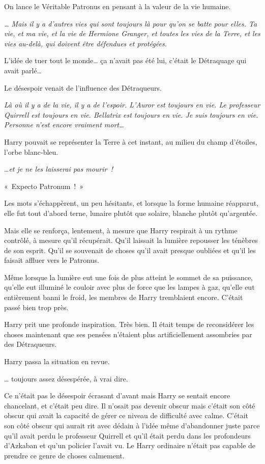 On lance le Véritable Patronus en pensant à la valeur de la vie humaine.

\emph{… Mais il y a d'autres vies qui sont toujours là pour qu'on se batte pour elles.
Ta vie, et ma vie, et la vie de Hermione Granger, et toutes les vies de la Terre, et les vies au-delà, qui doivent être défendues et protégées.}

L'idée de tuer tout le monde… ça n'avait pas été lui, c'était le Détraquage qui avait parlé…

Le désespoir venait de l'influence des Détraqueurs.

\emph{Là où il y a de la vie, il y a de l'espoir.
L'Auror est toujours en vie.
Le professeur Quirrell est toujours en vie.
Bellatrix est toujours en vie.
Je suis toujours en vie.
Personne n'est encore vraiment mort…}

Harry pouvait se représenter la Terre à cet instant, au milieu du champ d'étoiles, l'orbe blanc-bleu.

…\emph{et je ne les laisserai pas mourir~!}

«~Expecto Patronum~!~»

Les mots s'échappèrent, un peu hésitants, et lorsque la forme humaine réapparut, elle fut tout d'abord terne, lunaire plutôt que solaire, blanche plutôt qu'argentée.

Mais elle se renforça, lentement, à mesure que Harry respirait à un rythme contrôlé, à mesure qu'il récupérait.
Qu'il laissait la lumière repousser les ténèbres de son esprit.
Qu'il se souvenait de choses qu'il avait presque oubliées et qu'il les faisait affluer vers le Patronus.

Même lorsque la lumière eut une fois de plus atteint le sommet de sa puissance, qu'elle eut illuminé le couloir avec plus de force que les lampes à gaz, qu'elle eut entièrement banni le froid, les membres de Harry tremblaient encore.
C'était passé bien trop près.

Harry prit une profonde inspiration.
Très bien.
Il était temps de reconsidérer les choses maintenant que ses pensées n'étaient plus artificiellement assombries par des Détraqueurs.

Harry passa la situation en revue.

… toujours assez désespérée, à vrai dire.

Ce n'était pas le désespoir écrasant d'avant mais Harry se sentait encore chancelant, et c'était peu dire.
Il n'osait pas devenir obscur mais c'était son côté obscur qui avait la capacité de gérer ce niveau de difficulté avec calme.
C'était son côté obscur qui aurait rit avec dédain à l'idée même d'abandonner juste parce qu'il avait perdu le professeur Quirrell et qu'il était perdu dans les profondeurs d'Azkaban et qu'un policier l'avait vu.
Le Harry ordinaire n'était pas capable de prendre ce genre de choses calmement.

